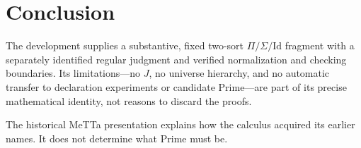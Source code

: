 \documentclass[11pt]{article}
\begin{document}
\section{Conclusion}

The development supplies a substantive, fixed two-sort
$\Pi/\Sigma/\mathrm{Id}$ fragment with a separately identified regular
judgment and verified normalization and checking boundaries.
Its limitations---no $J$, no universe hierarchy, and no automatic transfer
to declaration experiments or candidate Prime---are part of its precise
mathematical identity, not reasons to discard the proofs.

The historical MeTTa presentation explains how the calculus acquired its
earlier names. It does not determine what Prime must be.
\end{document}
